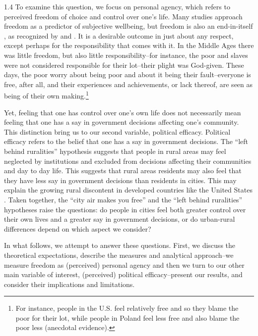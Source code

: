 \documentclass[10pt, letterpaper]{article}
\begin{document}
\begin{spacing}{1.4}
To examine this question, we focus on personal agency, which refers to perceived freedom of choice and control over one's life. Many studies approach freedom as a predictor of subjective wellbeing, but freedom
is also an end-in-itself \citep{aok_free_from_to}, as recognized by 
\citet{fromm13,fromm12,fromm92,fromm64,fromm44,fromm94} and \citet{sen00}. It is
a desirable outcome in just about any respect, except perhaps for the
responsibility that comes with it. In the Middle Ages there was little freedom,
but also little responsibility--for instance, the poor and slaves were not
considered responsible for their lot--their plight was God-given. These days,
the poor worry about being poor and about it being their fault--everyone is
free, after all, and their experiences and achievements, or lack thereof, are
seen as being of their own making.\footnote{
 For instance,
 people in the U.S. feel relatively free and so they blame the poor for their
 lot, while people in Poland feel less free \citep{ee_ls15} and also blame the poor less
 (anecdotal evidence).} 

Yet, feeling that one has control over one's own life does not necessarily mean feeling that one has a say in government decisions affecting one's community. This distinction bring us to our second variable, political efficacy.
Political efficacy refers to the belief that one has a say in government
decisions. The ``left behind ruralities'' hypothesis suggests that people in
rural areas may feel neglected by institutions and excluded from decisions
affecting their communities and day to day
life\citep{ulrich2021people,rodriguez2018revenge}. This suggests that rural
areas residents may also feel that they have less say in government decisions
than residents in cities. This may explain the growing rural discontent in
developed countries like the United States \citep{aok-swbGenYcity18}. 
Taken together, the ``city air makes you free'' and the ``left behind ruralities'' hypotheses raise the questions: do people in cities feel both greater control over their own lives and a greater say in government decisions, or do urban-rural differences depend on which aspect we consider?

In what follows, we attempt to answer these questions. First, we discuss the theoretical expectations, describe the measures and analytical approach--we measure freedom as (perceived) personal agency and then we turn to our other main variable of interest, (perceived) political efficacy--present our results, and consider their implications and limitations.  


\end{spacing}
\end{document}
